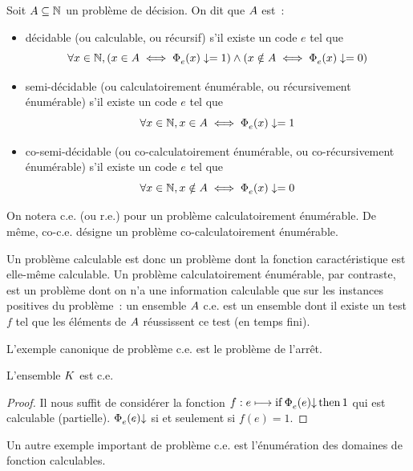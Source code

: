 \begin{definition}
  Soit $A \subseteq \mathbb N$ un problème de décision. On dit que $A$ est~:
  \begin{itemize}
  \item décidable (ou calculable, ou récursif) s'il existe un code $e$ tel que
    \[\forall x \in \mathbb N, (x \in A \iff \operatorname{\Phi}_{e}^{}(x) \mathrel{\mathord{\mathbin{\downarrow}}\mathord{=}} 1) \land
    (x \notin A \iff \operatorname{\Phi}_{e}^{}(x) \mathrel{\mathord{\mathbin{\downarrow}}\mathord{=}} 0)\]
  \item semi-décidable (ou calculatoirement énumérable, ou récursivement
    énumérable) s'il existe un code $e$ tel que
    \[\forall x \in \mathbb N, x \in A \iff \operatorname{\Phi}_{e}^{}(x) \mathrel{\mathord{\mathbin{\downarrow}}\mathord{=}} 1\]
  \item co-semi-décidable (ou co-calculatoirement énumérable, ou
    co-récursivement énumérable) s'il existe un code $e$ tel que
    \[\forall x \in \mathbb N, x \notin A \iff \operatorname{\Phi}_{e}^{}(x) \mathrel{\mathord{\mathbin{\downarrow}}\mathord{=}} 0\]
  \end{itemize}
\end{definition}

\begin{notation}
  On notera c.e. (ou r.e.) pour un problème calculatoirement énumérable. De
  même, co-c.e. désigne un problème co-calculatoirement énumérable.
\end{notation}

Un problème calculable est donc un problème dont la fonction caractéristique
est elle-même calculable. Un problème calculatoirement énumérable, par
contraste, est un problème dont on n'a une information calculable que sur les
instances positives du problème~: un ensemble $A$ c.e. est un ensemble dont
il existe un test $f$ tel que les éléments de $A$ réussissent ce test (en
temps fini).

L'exemple canonique de problème c.e. est le problème de l'arrêt.

\begin{proposition}
  L'ensemble $K$ est c.e.
\end{proposition}

\begin{proof}
  Il nous suffit de considérer la fonction
  $f : e \longmapsto \operatorname{if}{\operatorname{\Phi}_{e}^{}(e)\mathbin{\downarrow}}\operatorname{then}{1}$ qui est
  calculable (partielle). $\operatorname{\Phi}_{e}^{}(e)\mathbin{\downarrow}$ si et seulement si $f(e) = 1$.
\end{proof}

Un autre exemple important de problème c.e. est l'énumération des domaines
de fonction calculables.

